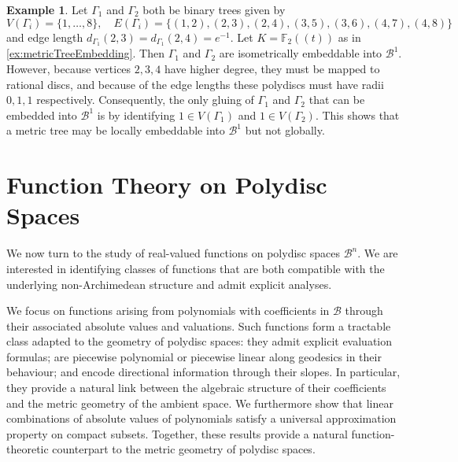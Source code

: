 \documentclass[10pt]{article}
\theoremstyle{definition}
\newtheorem{example}[theorem]{Example}
\newcommand{\FF}{\mathbb{F}}
\begin{document}
\begin{example}
  \label{ex:metricTreeEmbeddingTechnicalities}
  Let $\Gamma_1$ and $\Gamma_2$ both be binary trees given by
  \begin{equation*}
    V(\Gamma_i) = \{1,\dots,8\}, \quad E(\Gamma_i) = \{(1,2),(2,3),(2,4),(3,5),(3,6),(4,7),(4,8)\}
  \end{equation*}
  and edge length $d_{\Gamma_1}(2,3)=d_{\Gamma_1}(2,4)=e^{-1}$. Let $K=\FF_2(\!(t)\!)$ as in \cref{ex:metricTreeEmbedding}.
  Then $\Gamma_1$ and $\Gamma_2$ are isometrically embeddable into $\mathcal B^1$.  However, because vertices $2,3,4$ have higher degree, they must be mapped to rational discs, and because of the edge lengths these polydiscs must have radii $0,1,1$ respectively.
  Consequently, the only gluing of $\Gamma_1$ and $\Gamma_2$ that can be embedded into $\mathcal B^1$ is by identifying $1\in V(\Gamma_1)$ and $1\in V(\Gamma_2)$.
  This shows that a metric tree may be locally embeddable into $\mathcal B^1$ but not globally.
\end{example}





\section{Function Theory on Polydisc Spaces}

\label{sec:functions}
We now turn to the study of real-valued functions on polydisc spaces $\mathcal{B}^n$. We are interested in identifying classes of functions that are both compatible with the underlying non-Archimedean structure and admit explicit analyses.

We focus on functions arising from polynomials with coefficients in $\mathcal{B}$ through their associated absolute values and valuations. Such functions form a tractable class adapted to the geometry of polydisc spaces: they admit explicit evaluation formulas; are piecewise polynomial or piecewise linear along geodesics in their behaviour; and encode directional information through their slopes. In particular, they provide a natural link between the algebraic structure of their coefficients and the metric geometry of the ambient space. We furthermore show that linear combinations of absolute values of polynomials satisfy a universal approximation property on compact subsets. Together, these results provide a natural function-theoretic counterpart to the metric geometry of polydisc spaces.\\
\end{document}

